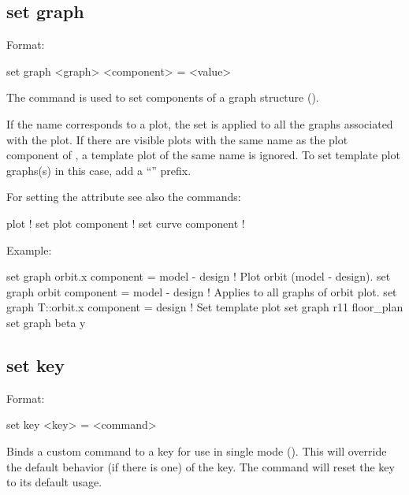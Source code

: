 {{%

\subsection{set graph}
\label{s:set.graph}

Format:
\begin{example}
  set graph <graph> <component> = <value>
\end{example}

The  command is used to set components of a graph structure ().

If the  name corresponds to a plot, the set is applied to all the graphs associated with
the plot. If there are visible plots with the same name as the plot component of , a
template plot of the same name is ignored. To set template plot graphs(s) in this case, add a
``'' prefix.

For setting the  attribute see also the commands:
\begin{example}
  plot                    ! 
  set plot component      ! 
  set curve component     ! 
\end{example}

Example:
\begin{example}
  set graph orbit.x component = model - design  ! Plot orbit (model - design).
  set graph orbit component = model - design    ! Applies to all graphs of orbit plot.
  set graph T::orbit.x component = design       ! Set template plot
  set graph r11 floor_plan%
  set graph beta y%
\end{example}


\subsection{set key}
\label{s:set.key}

Format:
\begin{example}
  set key <key> = <command>
\end{example}

Binds a custom command to a key for use in single mode ().  This will override the
default behavior (if there is one) of the key.  The command  will reset the key to its
default usage.

}}

